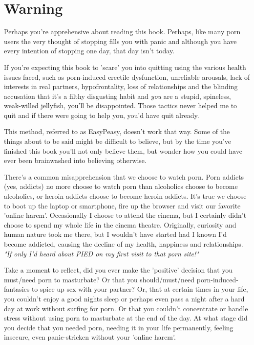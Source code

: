 \documentclass[easypeasy.tex]{subfiles}
\begin{document}
\section{Warning}
Perhaps you're apprehensive about reading this book. Perhaps, like many porn users the very thought of stopping fills you with panic and although you have every intention of stopping one day, that day isn't today.

If you're expecting this book to 'scare' you into quitting using the various health issues faced, such as porn-induced erectile dysfunction, unreliable arousals, lack of interests in real partners, hypofrontality, loss of relationships and the blinding accusation that it's a filthy disgusting habit and \textit{you} are a stupid, spineless, weak-willed jellyfish, you'll be disappointed. Those tactics never helped me to quit and if there were going to help you, you'd have quit already.

This method, referred to as EasyPeasy, doesn't work that way. Some of the things about to be said might be difficult to believe, but by the time you've finished this book you'll not only believe them, but wonder how you could have ever been brainwashed into believing otherwise.

There's a common misapprehension that we choose to watch porn. Porn addicts (yes, addicts) no more choose to watch porn than alcoholics choose to become alcoholics, or heroin addicts choose to become heroin addicts. It's true we choose to boot up the laptop or smartphone, fire up the browser and visit our favorite 'online harem'. Occasionally I choose to attend the cinema, but I certainly didn't choose to spend my whole life in the cinema theatre. Originally, curiosity and human nature took me there, but I wouldn't have started had I known I'd become addicted, causing the decline of my health, happiness and relationships.
\textit{"If only I'd heard about PIED on my first visit to that porn site!"}

Take a moment to reflect, did you ever make the 'positive' decision that you must/need porn to masturbate? Or that you should/must/need porn-induced-fantasies to spice up sex with your partner? Or, that at certain times in your life, you couldn't enjoy a good nights sleep or perhaps even pass a night after a hard day at work without surfing for porn. Or that you couldn't concentrate or handle stress without using porn to masturbate at the end of the day. At what stage did you decide that you needed porn, needing it in your life permanently, feeling insecure, even panic-stricken without your 'online harem'.
\end{document}
